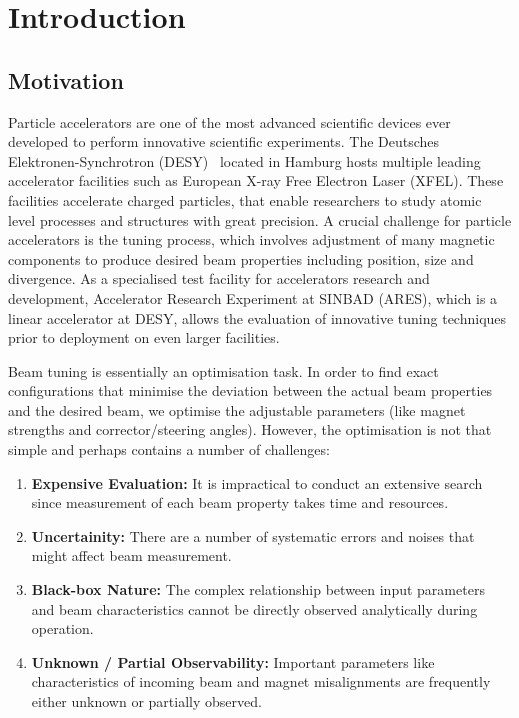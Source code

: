 \section{Introduction}\label{a:latex_en}

\subsection{Motivation}

Particle accelerators are one of the most advanced scientific devices ever developed 
to perform innovative scientific experiments. The Deutsches Elektronen-Synchrotron 
(DESY)~\cite{DESYwebsite} located in Hamburg hosts multiple leading accelerator facilities such as 
European X-ray Free Electron Laser (XFEL). These facilities accelerate charged particles, 
that enable researchers to study atomic level processes and structures with 
great precision. A crucial challenge for particle accelerators is the tuning process, which 
involves adjustment of many magnetic components to produce desired beam properties including 
position, size and divergence. As a specialised test facility for accelerators research and 
development, Accelerator Research Experiment at SINBAD (ARES), which is a linear accelerator at DESY,
allows the evaluation of innovative tuning techniques prior to deployment on even larger facilities. \

Beam tuning is essentially an optimisation task. In order to find exact configurations that minimise the 
deviation between the actual beam properties and the desired beam, we optimise the adjustable parameters 
(like magnet strengths and corrector/steering angles). However, the optimisation is not that simple and 
perhaps contains a number of challenges: 

\begin{enumerate}
    \item \textbf{Expensive Evaluation:} It is impractical to conduct an extensive search since measurement of each beam property takes time and resources.
    \item \textbf{Uncertainity:} There are a number of systematic errors and noises that might affect beam measurement.
    \item \textbf{Black-box Nature:} The complex relationship between input parameters and beam characteristics cannot be directly observed analytically during operation.
    \item \textbf{Unknown / Partial Observability:} Important parameters like characteristics of incoming beam and magnet misalignments are frequently either unknown or partially observed. 

\end{enumerate}


